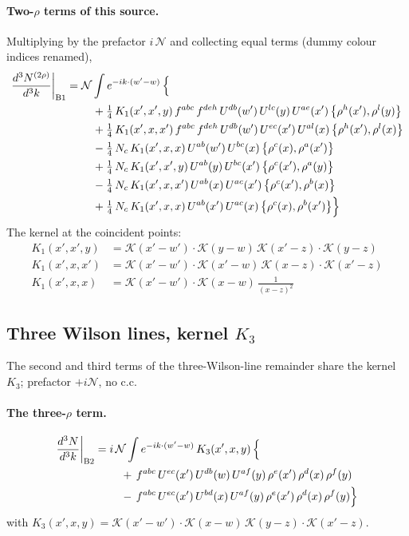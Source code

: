 \documentclass[10pt]{article}
\numberwithin{equation}{section}
\newcommand{\KK}{\mathcal K}
\newcommand{\NN}{\mathcal N}
\begin{document}
\paragraph{Two-$\rho$ terms of this source.} Multiplying by the prefactor $i\,\NN$ and collecting equal terms (dummy colour indices renamed),
\begin{align}
\frac{d^3N^{(2\rho)}}{d^3k}\bigg|_{\rm B1}={}&\NN\int e^{-ik\cdot(w'-w)}\,\Big\{\notag\\
&\quad +\tfrac14\,K_1(x',x',y)\,f^{abc}\,f^{deh}\,U^{db}(w')\,U^{lc}(y)\,U^{ae}(x')\,\big\{\rho^{h}(x'),\rho^{l}(y)\big\}\notag\\
&\quad +\tfrac14\,K_1(x',x,x')\,f^{abc}\,f^{deh}\,U^{db}(w')\,U^{ec}(x')\,U^{al}(x)\,\big\{\rho^{h}(x'),\rho^{l}(x)\big\}\notag\\
&\quad -\tfrac14\,N_{c}\,K_1(x',x,x)\,U^{ab}(w')\,U^{bc}(x)\,\big\{\rho^{c}(x),\rho^{a}(x')\big\}\notag\\
&\quad +\tfrac14\,N_{c}\,K_1(x',x',y)\,U^{ab}(y)\,U^{bc}(x')\,\big\{\rho^{c}(x'),\rho^{a}(y)\big\}\notag\\
&\quad -\tfrac14\,N_{c}\,K_1(x',x,x')\,U^{ab}(x)\,U^{ac}(x')\,\big\{\rho^{c}(x'),\rho^{b}(x)\big\}\notag\\
&\quad +\tfrac14\,N_{c}\,K_1(x',x,x)\,U^{ab}(x')\,U^{ac}(x)\,\big\{\rho^{c}(x),\rho^{b}(x')\big\}\Big\}\label{R:eq:res-B1}
\end{align}
The kernel at the coincident points:
\begin{align*}
K_1(x',x',y)&=\KK(x'-w')\cdot\KK(y-w)\,\KK(x'-z)\cdot\KK(y-z)\\K_1(x',x,x')&=\KK(x'-w')\cdot\KK(x'-w)\,\KK(x-z)\cdot\KK(x'-z)\\K_1(x',x,x)&=\KK(x'-w')\cdot\KK(x-w)\,\frac{1}{(x-z)^2}
\end{align*}
\subsection{Three Wilson lines, kernel $K_3$}\label{R:sec:B2}
The second and third terms of the three-Wilson-line remainder share the kernel $K_3$; prefactor $+i\NN$, no c.c.
\paragraph{The three-$\rho$ term.}
\begin{align}
\frac{d^3N}{d^3k}\bigg|_{\rm B2}={}&i\,\NN\int e^{-ik\cdot(w'-w)}\,K_3(x',x,y)\,\Big\{\notag\\
&\quad +\,f^{abc}\,U^{ec}(x')\,U^{db}(w)\,U^{af}(y)\,\rho^{e}(x')\,\rho^{d}(x)\,\rho^{f}(y)\notag\\
&\quad -\,f^{abc}\,U^{ec}(x')\,U^{bd}(x)\,U^{af}(y)\,\rho^{e}(x')\,\rho^{d}(x)\,\rho^{f}(y)\Big\}\label{R:eq:in-B2}
\end{align}
with $K_3(x',x,y)=\KK(x'-w')\cdot\KK(x-w)\,\KK(y-z)\cdot\KK(x'-z)$.
\end{document}
